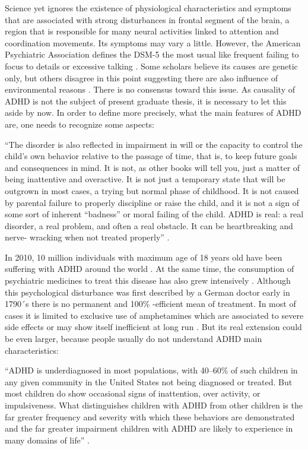 Science yet ignores the existence of physiological characteristics and symptoms that are associated with strong disturbances in frontal segment of the brain, a region that is responsible for many neural activities linked to attention and coordination movements. Its symptoms may vary a little. However, the American Psychiatric Association defines the DSM-5 the most usual like frequent failing to focus to details or excessive talking \citep{association2013dsm, Ahma-2013}. Some scholars believe its causes are genetic only, but others disagree in this point suggesting there are also influence of environmental reasons \citep{ADHDDay}. There is no consensus toward this issue. As causality of ADHD is not the subject of present graduate thesis, it is necessary to let this aside by now. In order to define more precisely, what the main features of ADHD are, one needs to recognize some aspects:



``The disorder is also reflected in impairment in will or the capacity to control the child’s own behavior relative to the passage of time, that is, to keep future goals and consequences in mind. It is not, as other books will tell you, just a matter of being inattentive and overactive. It is not just a temporary state that will be outgrown in most cases, a trying but normal phase of childhood. It is not caused by parental failure to properly discipline or raise the child, and it is not a sign of some sort of inherent “badness” or moral failing of the child. ADHD is real: a real disorder, a real problem, and often a real obstacle. It can be heartbreaking and nerve- wracking when not treated properly'' \citep{RBarkley}.



In 2010, 10 million individuals with maximum age of 18 years old have been suffering with ADHD around the world \citep{Psychoanalytic}. At the same time, the consumption of psychiatric medicines to treat this disease has also grew intensively  \citep{Psychoanalytic}. Although this psychological disturbance was first described by a German doctor early in 1790´s there is no permanent and 100\% -efficient mean of treatment. In most of cases it is limited to exclusive use of amphetamines which are associated to severe side effects or may show itself inefficient at long run  \citep{Psychoanalytic}. But its real extension  could be even larger, because people usually  do not understand ADHD main characteristics:



``ADHD is underdiagnosed in most populations, with 40–60\% of such children in any given community in the United States not being diagnosed or treated. But most children do show occasional signs of inattention, over activity, or impulsiveness. What distinguishes children with ADHD from other children is the far greater frequency and severity with which these behaviors are demonstrated and the far greater impairment children with ADHD are likely to experience in many domains of life'' \citep{RBarkley}.



